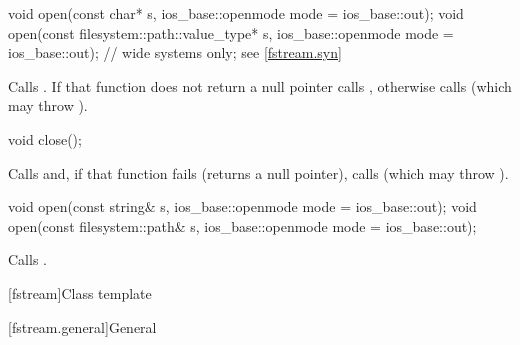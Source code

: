 %
\begin{itemdecl}
void open(const char* s, ios_base::openmode mode = ios_base::out);
void open(const filesystem::path::value_type* s,
          ios_base::openmode mode = ios_base::out);             // wide systems only; see \ref{fstream.syn}
\end{itemdecl}

\begin{itemdescr}
\pnum
\effects
Calls
.
If that function does not return a null pointer
calls ,
otherwise calls
(which may throw
).
\end{itemdescr}

%
\begin{itemdecl}
void close();
\end{itemdecl}

\begin{itemdescr}
\pnum
\effects
Calls
and, if that function fails (returns a null pointer), calls
(which may throw
).
\end{itemdescr}

%
\begin{itemdecl}
void open(const string& s, ios_base::openmode mode = ios_base::out);
void open(const filesystem::path& s, ios_base::openmode mode = ios_base::out);
\end{itemdecl}

\begin{itemdescr}
\pnum
\effects
Calls .
\end{itemdescr}

[fstream]{Class template }

[fstream.general]{General}

